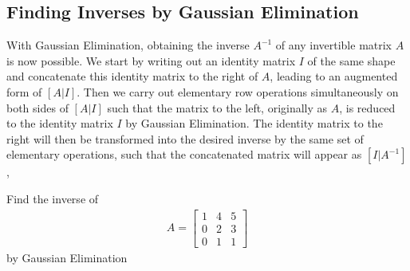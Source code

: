 \subsection{Finding Inverses by Gaussian Elimination}
\label{subsection:invGauss}
With Gaussian Elimination, obtaining the inverse $A^{-1}$ of any invertible matrix $A$ is now possible. We start by writing out an identity matrix $I$ of the same shape and concatenate this identity matrix to the right of $A$, leading to an augmented form of $[A|I]$. Then we carry out elementary row operations simultaneously on both sides of $[A|I]$ such that the matrix to the left, originally as $A$, is reduced to the identity matrix $I$ by Gaussian Elimination. The identity matrix to the right will then be transformed into the desired inverse by the same set of elementary operations, such that the concatenated matrix will appear as $[I|A^{-1}]$, 
\begin{exmp}
Find the inverse of
\begin{align*}
A =
\begin{bmatrix}
1 & 4 & 5 \\
0 & 2 & 3 \\
0 & 1 & 1
\end{bmatrix}
\end{align*}
by Gaussian Elimination
\end{exmp}
